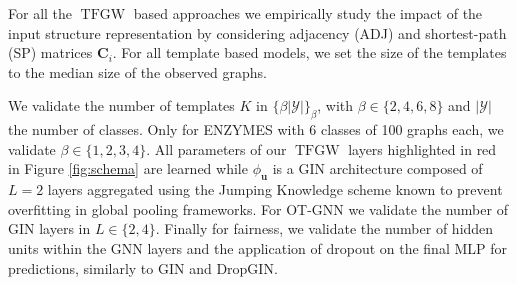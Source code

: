 \documentclass{article}
\def\vu{{\bm{u}}}
\def\mC{{\bm{C}}}
\newcommand{\TFGW}{\operatorname{TFGW}}
\begin{document}
For all the $\TFGW$ based approaches we empirically study the impact of the
input structure representation by considering adjacency (ADJ) and
shortest-path (SP) matrices $\mC_i$. For all template based models, we set the size of
the templates to the median size of the observed graphs. 

We validate the number of templates $K$ in $\{\beta |\mathcal{Y}|\}_\beta$, with $\beta \in \{2,4,6,8\}$ and $|\mathcal{Y}|$ the number of classes. Only for ENZYMES with 6
classes of 100 graphs each, we validate $\beta \in \{1, 2, 3,
4\}$.
All parameters of our $\TFGW$ layers highlighted in \textcolor{myred}{red} in Figure
\ref{fig:schema} are learned while $\phi_\vu$ is a GIN architecture
\cite{xu2018powerful} composed of $L=2$ layers aggregated using the Jumping Knowledge scheme \cite{xu2018representation}
known to prevent overfitting in global pooling frameworks. For OT-GNN 
we validate the number of GIN layers in $L \in \{2,4\}$. Finally for fairness, we validate the number
of hidden units within the
GNN layers and the application of dropout on the final MLP for predictions,
similarly to GIN and DropGIN.
\end{document}
